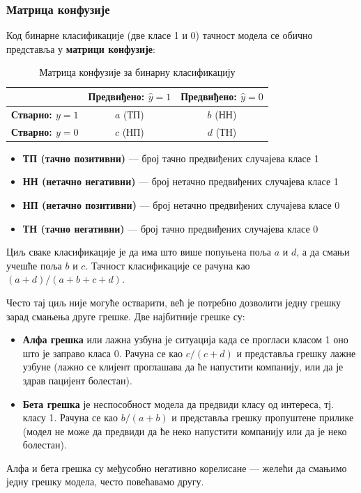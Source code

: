 \subsubsection{Матрица конфузије}
Код бинарне класификације (две класе 1 и 0) тачност модела се обично представља у \textbf{матрици конфузије}:

\begin{table}[h]
\centering
\caption{Матрица конфузије за бинарну класификацију}
\label{tab:matrica-konfuzije}
\begin{tabular}{|l|c|c|}
\hline
 & \textbf{Предвиђено: $\hat{y} = 1$} & \textbf{Предвиђено: $\hat{y} = 0$} \\
\hline
\textbf{Стварно: $y = 1$} & $a$ (ТП) & $b$ (НН) \\
\hline
\textbf{Стварно: $y = 0$} & $c$ (НП) & $d$ (ТН) \\
\hline
\end{tabular}
\end{table}
\begin{itemize}
  \item \textbf{ТП (тачно позитивни)} — број тачно предвиђених случајева класе 1
  \item \textbf{НН (нетачно негативни)} — број нетачно предвиђених случајева класе 1
  \item \textbf{НП (нетачно позитивни)} — број нетачно предвиђених случајева класе 0
  \item \textbf{ТН (тачно негативни)} — број тачно предвиђених случајева класе 0
\end{itemize}
Циљ сваке класификације је да има што више попуњена поља $a$ и $d$, а да смањи учешће поља $b$ и $c$. Тачност класификације се рачуна као $(a + d) / (a + b + c + d)$.

Често тај циљ није могуће остварити, већ је потребно дозволити једну грешку зарад смањења друге грешке. Две најбитније грешке су:

\begin{itemize}
  \item \textbf{Алфа грешка} или лажна узбуна је ситуација када се прогласи класом 1 оно што је заправо класа 0. Рачуна се као $c / (c + d)$ и представља грешку лажне узбуне (лажно се клијент проглашава да ће напустити компанију, или да је здрав пацијент болестан).
  \item \textbf{Бета грешка} је неспособност модела да предвиди класу од интереса, тј. класу 1. Рачуна се као $b / (a + b)$ и представља грешку пропуштене прилике (модел не може да предвиди да ће неко напустити компанију или да је неко болестан).
\end{itemize}
Алфа и бета грешка су међусобно негативно корелисане — желећи да смањимо једну грешку модела, често повећавамо другу.


